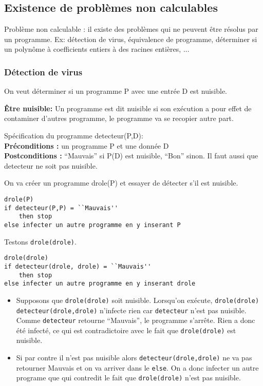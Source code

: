 	\subsection{Existence de problèmes non calculables}
	Problème non calculable : il existe des problèmes qui ne peuvent
		être résolus par un programme. Ex:
        détection de virus,
        équivalence de programme,
        déterminer si un polynôme à coefficients entiers à des racines entières, ...
	


\subsubsection{Détection de virus}
\label{sub:d_tection_de_virus}
On veut déterminer si un programme P avec une entrée D est nuisible.

\textbf{Être nuisible:} Un programme est dit nuisible si son exécution a pour effet de contaminer d'autres programme, le programme va se recopier autre part. 

Spécification du programme detecteur(P,D):\\
\textbf{Préconditions :} un programme P et une donnée D\\
\textbf{Postconditions :} ``Mauvais'' si P(D) est nuisible,
		``Bon'' sinon.
Il faut aussi que detecteur ne soit pas nuisible.

On va créer un programme drole(P) et essayer de détecter s’il est nuisible.

\begin{lstlisting}
drole(P)
if detecteur(P,P) = ``Mauvais''
	then stop
else infecter un autre programme en y inserant P
\end{lstlisting}

Testons \lstinline|drole(drole)|.
\begin{lstlisting}
drole(drole)
if detecteur(drole, drole) = ``Mauvais''
	then stop
else infecter un autre programme en y inserant drole
\end{lstlisting}

\begin{itemize}
	\item Supposons que \lstinline|drole(drole)| soit nuisible.
      Lorsqu'on exécute, \lstinline|drole(drole)|
      \lstinline|detecteur(drole,drole)| n'infecte rien car \lstinline|detecteur| n'est pas nuisible.
      Comme \lstinline|detecteur| retourne ``Mauvais'',
      le programme s'arrête.
      Rien a donc été infecté, ce qui est contradictoire avec le fait que \lstinline|drole(drole)| est nuisible.
	\item Si par contre il n'est pas nuisible alors \lstinline|detecteur(drole,drole)|
      ne va pas retourner Mauvais et on va arriver dans le \lstinline|else|.
      On a donc infecter un autre programe que qui contredit le fait que \lstinline|drole(drole)| n'est pas nuisible.
\end{itemize}


